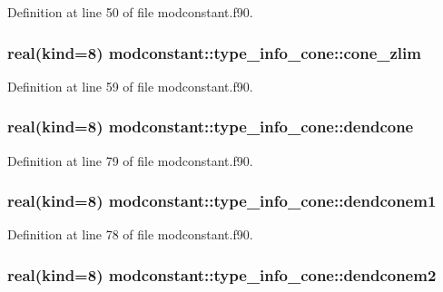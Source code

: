 Definition at line 50 of file modconstant.\-f90.

\hypertarget{structmodconstant_1_1type__info__cone_acb68bcedd4d6f0013fdfbdf8a514474e}{
\subsubsection[{cone\-\_\-zlim}]{\setlength{\rightskip}{0pt plus 5cm}real(kind=8) modconstant\-::type\-\_\-info\-\_\-cone\-::cone\-\_\-zlim}}\label{structmodconstant_1_1type__info__cone_acb68bcedd4d6f0013fdfbdf8a514474e}


Definition at line 59 of file modconstant.\-f90.

\hypertarget{structmodconstant_1_1type__info__cone_a0575c32e8c58594a62f27bd8fe8e1113}{
\subsubsection[{dendcone}]{\setlength{\rightskip}{0pt plus 5cm}real(kind=8) modconstant\-::type\-\_\-info\-\_\-cone\-::dendcone}}\label{structmodconstant_1_1type__info__cone_a0575c32e8c58594a62f27bd8fe8e1113}


Definition at line 79 of file modconstant.\-f90.

\hypertarget{structmodconstant_1_1type__info__cone_af9a35f9a494aa98d9711d6bc72aa2ba6}{
\subsubsection[{dendconem1}]{\setlength{\rightskip}{0pt plus 5cm}real(kind=8) modconstant\-::type\-\_\-info\-\_\-cone\-::dendconem1}}\label{structmodconstant_1_1type__info__cone_af9a35f9a494aa98d9711d6bc72aa2ba6}


Definition at line 78 of file modconstant.\-f90.

\hypertarget{structmodconstant_1_1type__info__cone_a5ae443262ad90eb7dc9677bec28fd271}{
\subsubsection[{dendconem2}]{\setlength{\rightskip}{0pt plus 5cm}real(kind=8) modconstant\-::type\-\_\-info\-\_\-cone\-::dendconem2}}\label{structmodconstant_1_1type__info__cone_a5ae443262ad90eb7dc9677bec28fd271}


